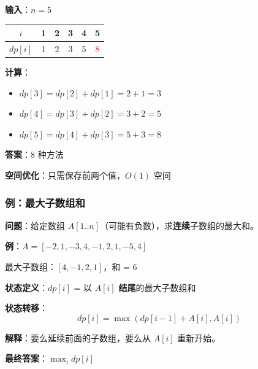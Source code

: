 \documentclass[12pt, a4paper]{ctexart}
\begin{document}
\begin{blackboard}[爬楼梯手算]

\textbf{输入}：$n = 5$

\begin{center}
\begin{tabular}{c|ccccc}
$i$ & 1 & 2 & 3 & 4 & 5 \\
\hline
$dp[i]$ & 1 & 2 & 3 & 5 & \textcolor{red}{8} \\
\end{tabular}
\end{center}

\textbf{计算}：
\begin{itemize}
    \item $dp[3] = dp[2] + dp[1] = 2 + 1 = 3$
    \item $dp[4] = dp[3] + dp[2] = 3 + 2 = 5$
    \item $dp[5] = dp[4] + dp[3] = 5 + 3 = 8$
\end{itemize}

\textbf{答案}：8 种方法

\textbf{空间优化}：只需保存前两个值，$O(1)$ 空间

\end{blackboard}

\subsubsection{例：最大子数组和}

\begin{blackboard}

\textbf{问题}：给定数组 $A[1..n]$（可能有负数），求\textbf{连续}子数组的最大和。

\textbf{例}：$A = [-2, 1, -3, 4, -1, 2, 1, -5, 4]$

最大子数组：$[4, -1, 2, 1]$，和 = 6

\textbf{状态定义}：$dp[i]$ = 以 $A[i]$ \textbf{结尾}的最大子数组和

\textbf{状态转移}：
\[
dp[i] = \max(dp[i-1] + A[i], A[i])
\]

\textbf{解释}：要么延续前面的子数组，要么从 $A[i]$ 重新开始。

\textbf{最终答案}：$\max_{i} dp[i]$

\end{blackboard}
\end{document}
